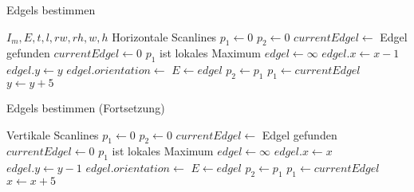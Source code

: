 \begin{algorithm}
\caption{Edgels bestimmen}
\label{alg:findedgels-horizontal}
	\begin{algorithmic}[1]
		\Require $I_m, E, t, l, \mathit{rw}, \mathit{rh}, w, h$
		\label{alg:findedgels-horizontal-scanlinestart}
		\Comment Horizontale Scanlines
			\State $p_1 \gets 0$
			\State $p_2 \gets 0$
			\label{alg:findedgels-horizontal-loopstart}
				\State $currentEdgel \gets$ 
				\label{alg:findedgels-horizontal-convolute}
				\label{alg:findedgels-horizontal-foundedgel}
					\Comment Edgel gefunden
				\Else
					\State $currentEdgel \gets 0$
				\EndIf
				\label{alg:findedgels-horizontal-maxima}
					\Comment $p_1$ ist lokales Maximum
					\State $edgel \gets \infty$
					\State $edgel.x \gets x - 1$
					\State $edgel.y \gets y$
					\State $edgel.orientation \gets$ 
					\State $E \gets edgel$
				\EndIf
				\State $p_2 \gets p_1$
				\label{alg:findedgels-horizontal-copy-prev1}
				\State $p_1 \gets currentEdgel$
				\label{alg:findedgels-horizontal-copy-edgel}
			\EndFor
			\label{alg:findedgels-horizontal-loopend}
			\State $y \gets y + 5$
			\label{alg:findedgels-horizontal-increment}
		\EndFor
		\label{alg:findedgels-horizontal-scanlineend}
	\end{algorithmic}
\end{algorithm}
\begin{algorithm}[ht]
	\caption{Edgels bestimmen (Fortsetzung)}
	\label{alg:findedgels-vertical}
	\begin{algorithmic}[1]
		\Comment Vertikale Scanlines
		\label{alg:findedgels-vertical-scanlinestart}
			\State $p_1 \gets 0$
			\State $p_2 \gets 0$
				\State $currentEdgel \gets$ 
					\Comment Edgel gefunden
				\Else
					\State $currentEdgel \gets 0$
				\EndIf
					\Comment $p_1$ ist lokales Maximum
					\State $edgel \gets \infty$
					\State $edgel.x \gets x$
					\State $edgel.y \gets y - 1$
					\State $edgel.orientation \gets$ 
					\State $E \gets edgel$
				\EndIf
				\State $p_2 \gets p_1$
				\State $p_1 \gets currentEdgel$
			\EndFor
			\State $x \gets x + 5$
		\EndFor
		\label{alg:findedgels-vertical-scanlineend}
	\end{algorithmic}
\end{algorithm}
